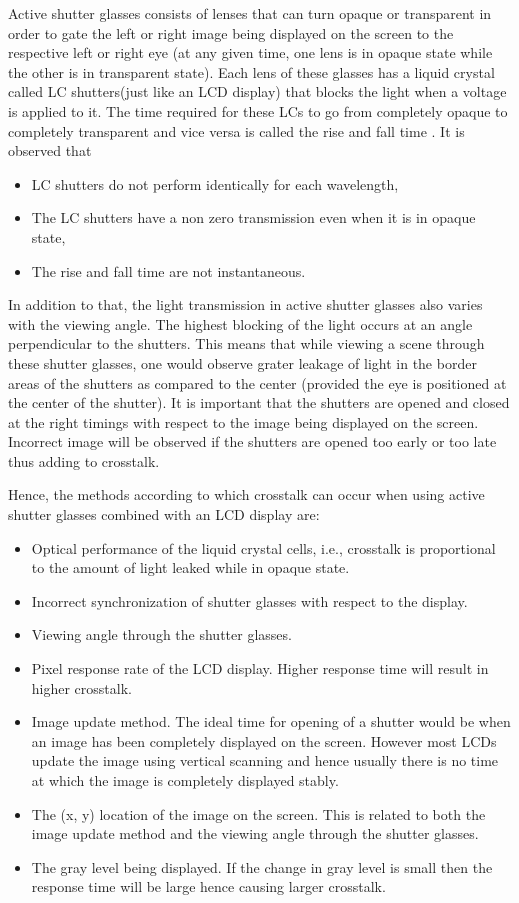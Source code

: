 Active shutter glasses consists of lenses that can turn opaque or transparent in order to gate the left or right image being displayed on the screen to the respective left or right eye (at any given time, one lens is in opaque state while the other is in transparent state). Each lens of these glasses has a liquid crystal called LC shutters(just like an LCD display) that blocks the light when a voltage is applied to it. The time required for these LCs to go from completely opaque to completely transparent and vice versa is called the rise and fall time \cite{woods2012crosstalk}. It is observed that

\begin{itemize}
\item{LC shutters do not perform identically for each wavelength,}
\item{The LC shutters have a non zero transmission even when it is in opaque state,}
\item{The rise and fall time are not instantaneous.}
\end{itemize}

In addition to that, the light transmission in active shutter glasses also varies with the viewing angle. The highest blocking of the light occurs at an angle perpendicular to the shutters. This means that while viewing a scene through these shutter glasses, one would observe grater leakage of light in the border areas of the shutters as compared to the center (provided the eye is positioned at the center of the shutter). It is important that the shutters are opened and closed at the right timings with respect to the image being displayed on the screen. Incorrect image will be observed if the shutters are opened too early or too late thus adding to crosstalk.

Hence, the methods according to which crosstalk can occur when using active shutter glasses combined with an LCD display are:
\begin{itemize}
	\item{Optical performance of the liquid crystal cells, i.e., crosstalk is proportional to the amount of light leaked while in opaque state.}
	\item{Incorrect synchronization of shutter glasses with respect to the display.}
	\item{Viewing angle through the shutter glasses.}
	\item{Pixel response rate of the LCD display. Higher response time will result in higher crosstalk.}
	\item{Image update method. The ideal time for opening of a shutter would be when an image has been completely displayed on the screen. However most LCDs update the image using vertical scanning and hence usually there is no time at which the image is completely displayed stably.}
	\item{The (x, y) location of the image on the screen. This is related to both the image update method and the viewing angle through the shutter glasses.}
	\item{The gray level being displayed. If the change in gray level is small then the response time will be large hence causing larger crosstalk. }
\end{itemize}

